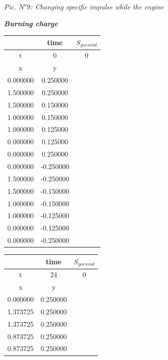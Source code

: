 \begin{flushright}
\textit{ Pic. $N^o 9$: Changing specific impulse while the engine } \\
\end{flushright}
\newpage

\begin{center}
\begin{large}
\textbf{\textit { Burning charge }} \\
\end{large}
\end{center}
\begin{center}
\begin{tabular}{|c|c|c|}
\hline
  & time & $S_{gor svod}$  \\
\hline
t & 0 & 0  \\
\hline
x & y &   \\
\hline
0.000000 &  0.250000 &
  \\ 
\hline
1.500000 &  0.250000 &
  \\ 
\hline
1.500000 &  0.150000 &
  \\ 
\hline
1.000000 &  0.150000 &
  \\ 
\hline
1.000000 &  0.125000 &
  \\ 
\hline
0.000000 &  0.125000 &
  \\ 
\hline
0.000000 &  0.250000 &
  \\ 
\hline
0.000000 &  -0.250000 &
  \\ 
\hline
1.500000 &  -0.250000 &
  \\ 
\hline
1.500000 &  -0.150000 &
  \\ 
\hline
1.000000 &  -0.150000 &
  \\ 
\hline
1.000000 &  -0.125000 &
  \\ 
\hline
0.000000 &  -0.125000 &
  \\ 
\hline
0.000000 &  -0.250000 &
  \\ 
\hline
\end{tabular}
\begin{tabular}{|c|c|c|}
\hline
  & time & $S_{gor svod}$  \\
\hline
t & 24 & 0  \\
\hline
x & y &   \\
\hline
0.000000 &  0.250000 &
  \\ 
\hline
1.373725 &  0.250000 &
  \\ 
\hline
1.373725 &  0.250000 &
  \\ 
\hline
0.873725 &  0.250000 &
  \\ 
\hline
0.873725 &  0.250000 &
  \\ 

\end{tabular}
\end{center}
